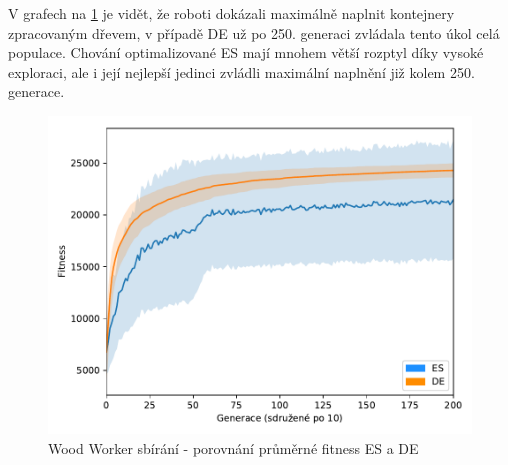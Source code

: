 	V grafech na \ref{obr04:PickupESvsDE} je vidět, že roboti dokázali maximálně naplnit kontejnery zpracovaným dřevem, v případě DE už po 250. generaci zvládala tento úkol celá populace. Chování optimalizované ES mají mnohem větší rozptyl díky vysoké exploraci, ale i její nejlepší jedinci zvládli maximální naplnění již kolem 250. generace. 
		   \begin{figure}[t]\centering       
		\includegraphics[width=\columnwidth]{../img/WoodMap/DEvsES/WorkerPickUpMem}
		\caption{Wood Worker sbírání - porovnání průměrné fitness ES a DE}
		\label{obr04:PickupESvsDE}
	\end{figure}
	\clearpage
